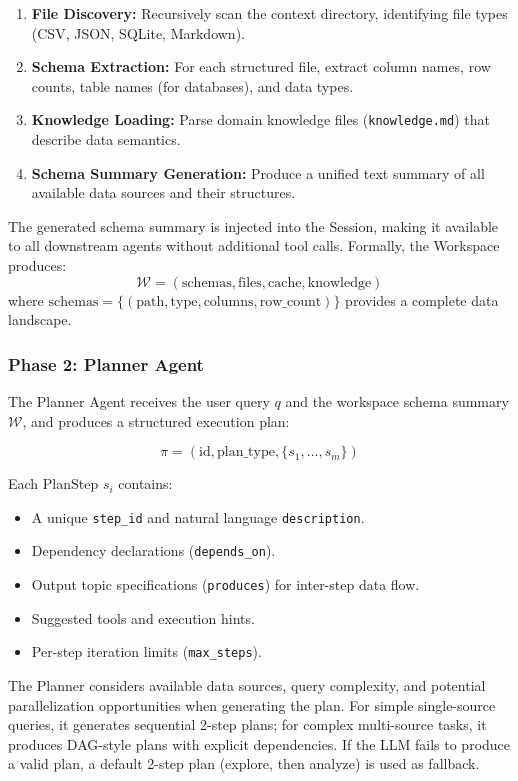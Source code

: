 \documentclass{article}
\begin{document}
\begin{enumerate}[leftmargin=1.5em]
    \item \textbf{File Discovery:} Recursively scan the context directory, identifying file types (CSV, JSON, SQLite, Markdown).
    \item \textbf{Schema Extraction:} For each structured file, extract column names, row counts, table names (for databases), and data types.
    \item \textbf{Knowledge Loading:} Parse domain knowledge files (\texttt{knowledge.md}) that describe data semantics.
    \item \textbf{Schema Summary Generation:} Produce a unified text summary of all available data sources and their structures.
\end{enumerate}

The generated schema summary is injected into the Session, making it available to all downstream agents without additional tool calls.
Formally, the Workspace produces:
\[
\mathcal{W} = (\text{schemas}, \text{files}, \text{cache}, \text{knowledge})
\]
where $\text{schemas} = \{(\text{path}, \text{type}, \text{columns}, \text{row\_count})\}$ provides a complete data landscape.

\subsubsection{Phase 2: Planner Agent}

The Planner Agent receives the user query $q$ and the workspace schema summary $\mathcal{W}$, and produces a structured execution plan:

\[
\pi = (\text{id}, \text{plan\_type}, \{s_1, \dots, s_m\})
\]

Each PlanStep $s_i$ contains:
\begin{itemize}[leftmargin=1.5em]
    \item A unique \texttt{step\_id} and natural language \texttt{description}.
    \item Dependency declarations (\texttt{depends\_on}).
    \item Output topic specifications (\texttt{produces}) for inter-step data flow.
    \item Suggested tools and execution hints.
    \item Per-step iteration limits (\texttt{max\_steps}).
\end{itemize}

The Planner considers available data sources, query complexity, and potential parallelization opportunities when generating the plan.
For simple single-source queries, it generates sequential 2-step plans; for complex multi-source tasks, it produces DAG-style plans with explicit dependencies.
If the LLM fails to produce a valid plan, a default 2-step plan (explore, then analyze) is used as fallback.
\end{document}
